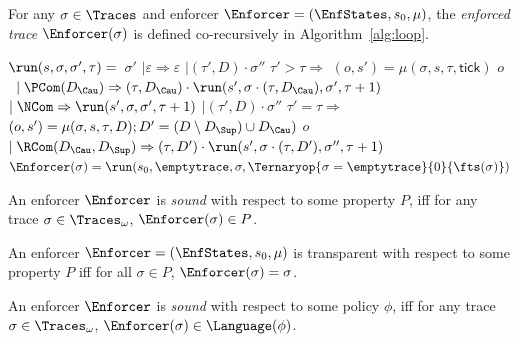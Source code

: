 \begin{definition}
  For any $\sigma \in \Traces$ and enforcer  $\Enforcer=(\EnfStates,s_0,\mu)$, the
  \emph{enforced trace} $\Enforcer(\sigma)$ is defined co-recursively in Algorithm~\ref{alg:loop}.
  \begin{algorithm}[t]
  \begin{algorithmic}[1]
    \State $\run(s,\sigma,\sigma',\tau)=$~\Case\;$\sigma'$ \OOf
    \State $\mid \varepsilon \Rightarrow \varepsilon$
    \State $\mid(\tau', D) \cdot \sigma''$ \When\;$\tau' > \tau \Rightarrow$ \Let\;$(o,s') = \mu(\sigma,s,\tau,\mathsf{tick})$ \IIn{}
    \State \quad \Case\;$o$ \OOf~$\mid\PCom(D_\Cau) \Rightarrow (\tau,D_\Cau) \cdot \run(s',\sigma\cdot (\tau, D_\Cau),\sigma',\tau+1)$
    \State \qquad\qquad\quad\, $\mid\NCom \Rightarrow \run(s',\sigma,\sigma',\tau+1)$
    \State  $\mid(\tau', D) \cdot \sigma''$ \When\;$\tau' = \tau \Rightarrow$ \Let\;$(o,s') = \mu(\sigma,s,\tau,D); D' = (D \setminus D_\Sup) \cup D_\Cau)$ \IIn
    \State \quad \Case\;$o$ \OOf ~$\mid \RCom(D_\Cau,D_\Sup) \Rightarrow (\tau, D') \cdot \run(s',\sigma \cdot (\tau, D'),\sigma'',\tau+1)$
    \State $\Enforcer(\sigma)=\run(s_0,\emptytrace,\sigma,\Ternaryop{\sigma=\emptytrace}{0}{\fts(\sigma)})$
  \end{algorithmic}
  \caption{Enforced trace\label{alg:loop}}
  \vspace{-1ex}
\end{algorithm}
\end{definition}

\begin{definition}
    \label{def:enf-sound-property}
    An enforcer $\Enforcer$ is \emph{sound} with respect to some property $P$, iff
    for any trace $\sigma \in \Traces_\omega$, $\Enforcer(\sigma) \in P$.
\end{definition}

\begin{definition}
    \label{def:enf-transparent-property}
    An enforcer $\Enforcer = \left( \EnfStates, s_0, \mu \right)$ is transparent
    with respect to some property $P$ iff for all $\sigma \in P$,
    $\Enforcer(\sigma) = \sigma$.
\end{definition}

\begin{definition}
    \label{def:enf-sound-policy}
    An enforcer $\Enforcer$ is \emph{sound} with respect to some policy $\phi$, iff
    for any trace $\sigma \in \Traces_\omega$, $\Enforcer(\sigma) \in \Language(\phi)$.
\end{definition}

